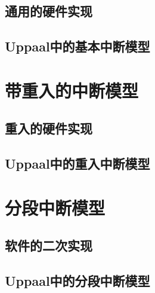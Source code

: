 \subsection{通用的硬件实现}
\label{subsec:basic_hardware}

\subsection{Uppaal中的基本中断模型}
\label{subsec:basic_uppaal}

\section{带重入的中断模型}
\label{sec:reentrant}

\subsection{重入的硬件实现}
\label{subsec:reentrant_hardware}

\subsection{Uppaal中的重入中断模型}
\label{subsec:reentrant_uppaal}

\section{分段中断模型}
\label{sec:segment}

\subsection{软件的二次实现}
\label{subsec:segment_software}

\subsection{Uppaal中的分段中断模型}
\label{subsec:segment_uppaal}